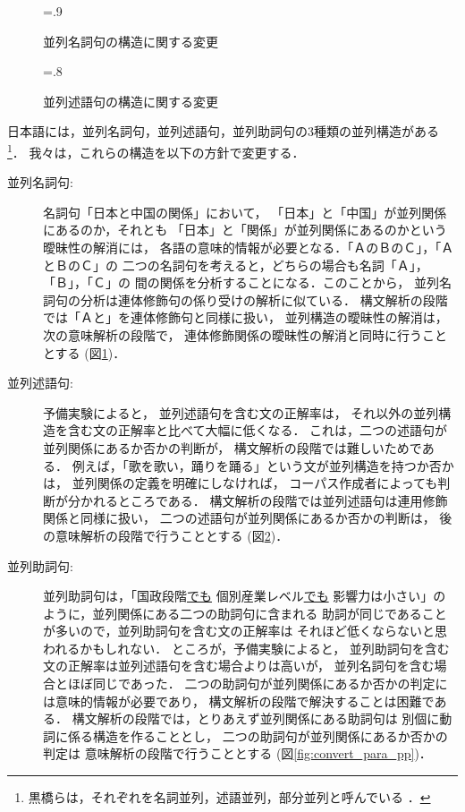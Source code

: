 \begin{figure}[tp]
  \centering
  \epsfxsize=.9\textwidth
  \caption{並列名詞句の構造に関する変更}
  \label{fig:convert_para_noun}
\end{figure}

\begin{figure}[tp]
  \centering
  \epsfxsize=.8\textwidth
  \caption{並列述語句の構造に関する変更}
  \label{fig:convert_para_verb}
\end{figure}



日本語には，並列名詞句，並列述語句，並列助詞句の3種類の並列構造がある
\footnote{黒橋らは，それぞれを名詞並列，述語並列，部分並列と呼んでいる
\cite{kurohashi:1998}．}．
我々は，これらの構造を以下の方針で変更する．
\begin{description}
\item[並列名詞句: ] 名詞句「日本と中国の関係」において，
  「日本」と「中国」が並列関係にあるのか，それとも
  「日本」と「関係」が並列関係にあるのかという曖昧性の解消には，
  各語の意味的情報が必要となる．「ＡのＢのＣ」，「ＡとＢのＣ」の
  二つの名詞句を考えると，どちらの場合も名詞「Ａ」，「Ｂ」，「Ｃ」の
  間の関係を分析することになる．このことから，
  並列名詞句の分析は連体修飾句の係り受けの解析に似ている．
  構文解析の段階では「Ａと」を連体修飾句と同様に扱い，
  並列構造の曖昧性の解消は，次の意味解析の段階で，
  連体修飾関係の曖昧性の解消と同時に行うこととする
  (図\ref{fig:convert_para_noun})．
\item[並列述語句: ] 予備実験\cite{noro:2003}によると，
  並列述語句を含む文の正解率は，
  それ以外の並列構造を含む文の正解率と比べて大幅に低くなる．
  これは，二つの述語句が並列関係にあるか否かの判断が，
  構文解析の段階では難しいためである．
  例えば，「歌を歌い，踊りを踊る」という文が並列構造を持つか否かは，
  並列関係の定義を明確にしなければ，
  コーパス作成者によっても判断が分かれるところである．
  構文解析の段階では並列述語句は連用修飾関係と同様に扱い，
  二つの述語句が並列関係にあるか否かの判断は，
  後の意味解析の段階で行うこととする
  (図\ref{fig:convert_para_verb})．
\item[並列助詞句: ] 並列助詞句は，「国政段階\underline{でも}
  個別産業レベル\underline{でも}
  影響力は小さい」のように，並列関係にある二つの助詞句に含まれる
  助詞が同じであることが多いので，並列助詞句を含む文の正解率は
  それほど低くならないと思われるかもしれない．
  ところが，予備実験\cite{noro:2003}によると，
  並列助詞句を含む文の正解率は並列述語句を含む場合よりは高いが，
  並列名詞句を含む場合とほぼ同じであった．
  二つの助詞句が並列関係にあるか否かの判定には意味的情報が必要であり，
  構文解析の段階で解決することは困難である．
  構文解析の段階では，とりあえず並列関係にある助詞句は
  別個に動詞に係る構造を作ることとし，
  二つの助詞句が並列関係にあるか否かの判定は
  意味解析の段階で行うこととする
  (図\ref{fig:convert_para_pp})．
\end{description}

